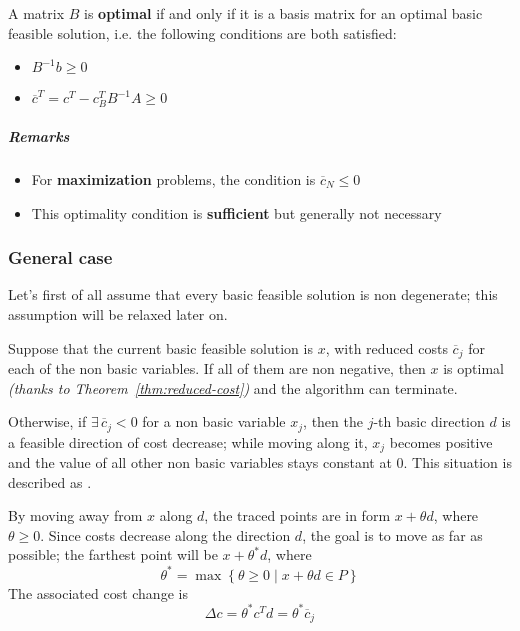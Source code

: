 \documentclass[english]{article}
\begin{document}
\begin{definition}
  A matrix \(B\) is \textbf{optimal} if and only if it is a basis matrix for an optimal basic feasible solution, i.e. the following conditions are both satisfied:

  \begin{itemize}
    \item \(B^{-1} b \geq 0\)
    \item \(\overline{c}^T = c^T - c^T_B B^{-1} A \geq 0\)
  \end{itemize}
  \label{def:optimal-matrix}
\end{definition}

\subparagraph*{Remarks}
\begin{itemize}[label=\(\rightarrow\)]
  \item For \textbf{maximization} problems, the condition is \(\overline{c}_N \leq 0\)
  \item This optimality condition is \textbf{sufficient} but generally not necessary
\end{itemize}

\subsubsection{General case}

Let's first of all assume that every basic feasible solution is non degenerate;
this assumption will be relaxed later on.

Suppose that the current basic feasible solution is \(x\), with reduced costs \(\overline{c}_j\) for each of the non basic variables.
If all of them are non negative, then \(x\) is optimal \textit{(thanks to Theorem~\ref{thm:reduced-cost})} and the algorithm can terminate.

Otherwise, if \(\exists \, \overline{c}_j < 0\) for a non basic variable \(x_j\), then the \(j\)-th basic direction \(d\) is a feasible direction of cost decrease;
while moving along it, \(x_j\) becomes positive and the value of all other non basic variables stays constant at \(0\).
This situation is described as .

By moving away from \(x\) along \(d\), the traced points are in form \(x + \theta d\), where \(\theta \geq 0\).
Since costs decrease along the direction \(d\), the goal is to move as far as possible;
the farthest point will be \(x + \theta^\ast d\), where
\[ \theta^\ast = \max \left\{ \theta \geq 0 \mid x + \theta d \in P \right\}\]
The associated cost change is
\[ \Delta c = \theta^\ast c^T d = \theta^\ast \overline{c}_j \]
\end{document}
